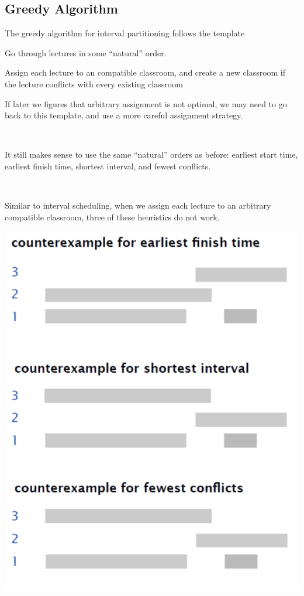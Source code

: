 \subsection{Greedy Algorithm}

The greedy algorithm for interval partitioning follows the template

\begin{listu}
    \item Go through lectures in some ``natural'' order.
    \item Assign each lecture to an  compatible classroom, and create a new classroom if the lecture conflicts with every existing classroom
\end{listu}

If later we figures that arbitrary assignment is not optimal, we may need to go back to this template, and use a more careful assignment strategy.

\begin{minipage}[t]{0.6\linewidth}
    {~~~}

    It still makes sense to use the same ``natural'' orders as before: earliest start time, earliest finish time, shortest interval, and fewest conflicts.

    {~~~}

    Similar to interval scheduling, when we assign each lecture to an arbitrary compatible classroom, three of these heuristics do not work.
\end{minipage}
\hfil%
\begin{minipage}[t]{0.35\linewidth}
    \begin{center}
        \includegraphics[width=0.9\linewidth,valign=t]{figures/interval-scheduling-counterexample.png}
    \end{center}
\end{minipage}

